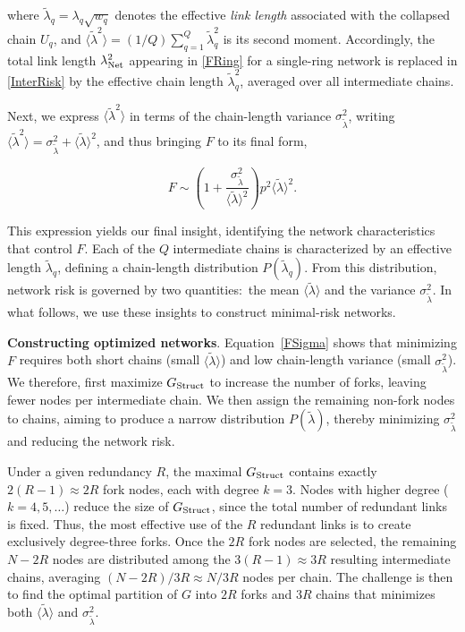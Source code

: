 \documentclass[oneside, a4paper, onecolumn, 11pt]{article}
\newcommand{\av}[1]{\langle #1 \rangle}
\begin{document}
\begin{refsection}
where $\tilde \lambda_q = \lambda_q \sqrt{w_q}$ denotes the effective \textit{link length} associated with the collapsed chain $U_q$, and $\av {\tilde \lambda^2} = (1/Q) \sum_{q = 1}^Q \tilde \lambda_q^2$ is its second moment. Accordingly, the total link length $\lambda_{\rm Net}^2$ appearing in \eqref{FRing} for a single-ring network is replaced in \eqref{InterRisk} by the effective chain length $\tilde \lambda_q^2$, averaged over all intermediate chains.

Next, we express $\av{\tilde \lambda^2}$ in terms of the chain-length variance $\sigma_{\tilde \lambda}^2$, writing $\av{\tilde \lambda^2} = \sigma_{\tilde \lambda}^2 + \av{\tilde \lambda}^2$, and thus bringing $F$ to its final form,

\begin{equation}
\label{FSigma}
F \sim
\left(
1 + \dfrac{\sigma_{\tilde \lambda}^2}{\av {\tilde \lambda}^2}
\right) p^2 \av {\tilde \lambda}^2.
\end{equation}

This expression yields our final insight, identifying the network characteristics that control $F$. Each of the $Q$ intermediate chains is characterized by an effective length $\tilde \lambda_q$, defining a chain-length distribution $P(\tilde \lambda_q)$. From this distribution, network risk is governed by two quantities:\ the mean $\av{\tilde \lambda}$ and the variance $\sigma_{\tilde \lambda}^2$. In what follows, we use these insights to construct minimal-risk networks.


\vspace{3mm}
\textbf{\color{blue} Constructing optimized networks}.
Equation~\eqref{FSigma} shows that minimizing $F$ requires both short chains (small $\av {\tilde \lambda}$) and low chain-length variance (small $\sigma_{\tilde \lambda}^2$). We therefore, first maximize $G_{\rm Struct}$ to increase the number of forks, leaving fewer nodes per intermediate chain. We then assign the remaining non-fork nodes to chains, aiming to produce a narrow distribution $P(\tilde \lambda)$, thereby minimizing $\sigma_{\tilde \lambda}^2$ and reducing the network risk.

Under a given redundancy $R$, the maximal $G_{\rm Struct}$ contains exactly $2(R - 1) \approx 2R$ fork nodes, each with degree $k = 3$. Nodes with higher degree ($k = 4,5,\dots$) reduce the size of $G_{\rm Struct}$, since the total number of redundant links is fixed. Thus, the most effective use of the $R$ redundant links is to create exclusively degree-three forks. Once the $2R$ fork nodes are selected, the remaining $N - 2R$ nodes are distributed among the $3(R - 1) \approx 3R$ resulting intermediate chains, averaging $(N - 2R)/3R \approx N/3R$ nodes per chain. The challenge is then to find the optimal partition of $G$ into $2R$ forks and $3R$ chains that minimizes both $\av{\tilde \lambda}$ and $\sigma_{\tilde \lambda}^2$.


\end{refsection}
\end{document}
